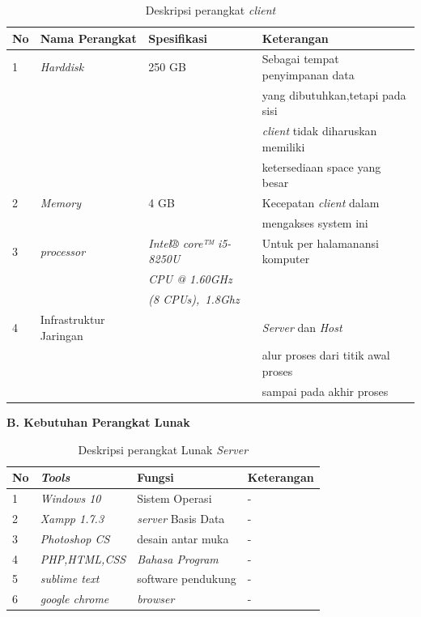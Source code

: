 \begin{table}[!htbp]
\captionsetup{singlelinecheck=off}
\caption{Deskripsi perangkat \textit{client}}
\label{perangkatclient}
\begin{tabular}{|l|l|l|l|}
\hline
No & Nama Perangkat & Spesifikasi & Keterangan \\
\hline

1 &  \textit{Harddisk} & 250 GB  & Sebagai tempat penyimpanan data  \\
 & & & yang dibutuhkan,tetapi pada sisi\\
 & & & \textit{client} tidak diharuskan memiliki  \\
 & & & ketersediaan space yang besar \\
\hline

2 &  \textit{Memory} & 4 GB & Kecepatan \textit{client} dalam \\
 & & &  mengakses system ini  \\
\hline

3 &  \textit{processor} & \textit{Intel® core™ i5-8250U  } &  Untuk per halamanansi komputer \\

 & & \textit{CPU @ 1.60GHz} &  \\
 
 & &\textit{(8 CPUs),~1.8Ghz} & \\
\hline

4 &  Infrastruktur Jaringan &    & \textit{Server} dan \textit{Host} \\    
 & & &  alur proses dari titik awal proses \\
& & & sampai pada akhir proses  \\

\hline
\end{tabular}
\end{table}

\textbf{B.	Kebutuhan Perangkat Lunak}

\begin{table}[!htbp]
\captionsetup{singlelinecheck=off}
\caption{Deskripsi perangkat Lunak \textit{Server}}
\label{lunakserver}
\begin{tabular}{|l|l|l|l|}
\hline
No & \textit{Tools} & Fungsi & Keterangan \\
\hline

1 &  \textit{Windows 10} & Sistem Operasi  & -  \\

\hline

2 &  \textit{Xampp 1.7.3} & \textit{server} Basis Data & - \\
\hline

3 &  \textit{Photoshop CS} & desain antar muka & - \\
\hline

4 &  \textit{PHP,HTML,CSS} & \textit{Bahasa Program} & -  \\    
\hline

5 & \textit{sublime text} & software pendukung & - \\
\hline

6 & \textit{google chrome} & \textit{browser} & - \\
\hline
\end{tabular}
\end{table}


